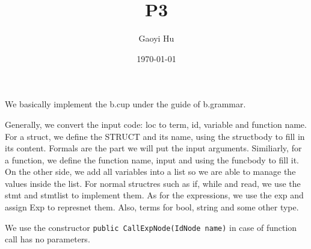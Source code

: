 \documentclass[11pt]{article}
\author{Gaoyi Hu}
\date{\today}
\title{P3}
\begin{document}
\maketitle
\tableofcontents

We basically implement the b.cup under the guide of b.grammar.

Generally, we convert the input code: loc to term, id, variable and function name.
For a struct, we define the STRUCT and its name, using the structbody to fill in its content. Formals are the part we will put the input arguments. Similiarly, for a function, we define the function name, input and using the funcbody to fill it.
On the other side, we add all variables into a list so we are able to manage the values inside the list.
For normal structres such as if, while and read, we use the stmt and stmtlist to implement them. As for the expressions, we use the exp and assign Exp to represnet them. Also, terms for bool, string and some other type. 

We use the constructor \texttt{public CallExpNode(IdNode name)} in case of function call has no parameters.
\end{document}
